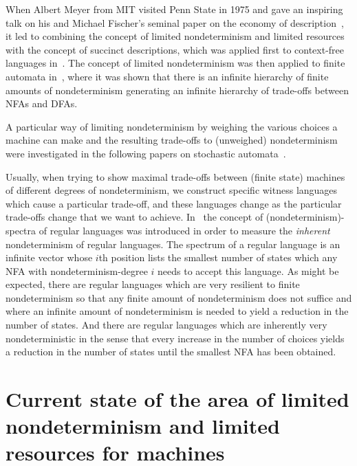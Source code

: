 \documentclass[copyright]{eptcs}
\begin{document}
When Albert Meyer from MIT visited Penn State in 1975 and gave an inspiring talk on his and Michael Fischer's seminal paper on
the economy of description~\cite{MeyerF71}, it led to combining the concept of limited nondeterminism and limited resources with 
the concept of succinct descriptions, which was applied first to context-free languages in~\cite{Kintala78}. The concept of
limited nondeterminism was then applied to finite automata in~\cite{KintalaW80}, where it was shown that there is an infinite hierarchy of
finite amounts of nondeterminism generating an infinite hierarchy of trade-offs between NFAs and DFAs.

A particular way of limiting nondeterminism by weighing the various choices a machine can make and the resulting trade-offs to (unweighed) 
nondeterminism were investigated in the following papers on stochastic automata~\cite{KintalaPW93,KintalaW86}. 

Usually, when trying to show maximal trade-offs between
(finite state) machines of different degrees of 
nondeterminism, we construct 
specific witness languages which cause a particular trade-off,
and these languages change as the particular trade-offs change
that we 
want to achieve. In~\cite{GoldstineKW90} the concept of 
(nondeterminism)-spectra of regular languages was introduced 
in order to measure the \emph{inherent}
 nondeterminism of regular languages. 
The spectrum of a regular language is an infinite vector whose 
$i$th position lists the smallest number 
of states which any NFA with nondeterminism-degree $i$ needs to accept this language. As might be expected, 
there are regular languages which are very resilient
to finite nondeterminism so that any finite amount of nondeterminism does not suffice 
and where an infinite amount of nondeterminism is needed to yield a reduction in the number of states. And there are regular languages which are 
inherently very nondeterministic in the sense that every increase in the number of choices yields a reduction in the number of 
states until the smallest NFA has been obtained.

\section{Current state of the area of limited nondeterminism and limited resources for machines}\label{s:spinoffs}
\end{document}
